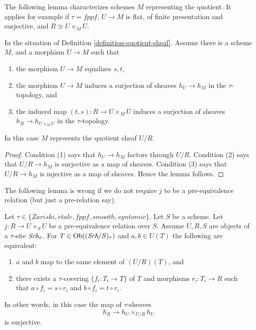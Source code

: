 \noindent
The following lemma characterizes schemes $M$ representing the quotient.
It applies for example if $\tau = fppf$, $U \to M$ is flat,
of finite presentation and surjective, and $R \cong U \times_M U$.

\begin{lemma}
\label{lemma-criterion-quotient-representable}
In the situation of Definition \ref{definition-quotient-sheaf}.
Assume there is a scheme $M$, and a morphism $U \to M$ such that
\begin{enumerate}
\item the morphism $U \to M$ equalizes $s, t$,
\item the morphism $U \to M$ induces a surjection of sheaves
$h_U \to h_M$ in the $\tau$-topology, and
\item the induced map $(t, s) : R \to U \times_M U$ induces a
surjection of sheaves $h_R \to h_{U \times_M U}$ in the $\tau$-topology.
\end{enumerate}
In this case $M$ represents the quotient sheaf $U/R$.
\end{lemma}

\begin{proof}
Condition (1) says that $h_U \to h_M$ factors through $U/R$.
Condition (2) says that $U/R \to h_M$ is surjective as a map of sheaves.
Condition (3) says that $U/R \to h_M$ is injective as a map of sheaves.
Hence the lemma follows.
\end{proof}

\noindent
The following lemma is wrong if we do not require $j$ to be a
pre-equivalence relation (but just a pre-relation say).

\begin{lemma}
\label{lemma-quotient-pre-equivalence}
Let $\tau \in \{Zariski, \acute{e}tale, fppf, smooth, syntomic\}$.
Let $S$ be a scheme.
Let $j : R \to U \times_S U$ be a pre-equivalence relation over $S$.
Assume $U, R, S$ are objects of a $\tau$-site $\textit{Sch}_\tau$.
For $T \in \mathop{\rm Ob}\nolimits((\textit{Sch}/S)_\tau)$ and
$a, b \in U(T)$ the following are equivalent:
\begin{enumerate}
\item $a$ and $b$ map to the same element of $(U/R)(T)$, and
\item there exists a $\tau$-covering $\{f_i : T_i \to T\}$ of $T$
and morphisms $r_i : T_i \to R$ such that
$a \circ f_i = s \circ r_i$ and $b \circ f_i = t \circ r_i$.
\end{enumerate}
In other words, in this case the map of $\tau$-sheaves
$$
h_R \longrightarrow h_U \times_{U/R} h_U
$$
is surjective.
\end{lemma}

